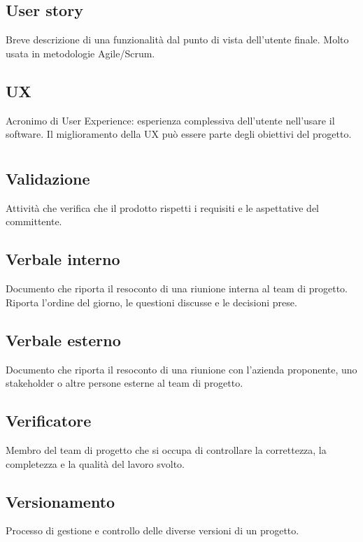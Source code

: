 \documentclass[a4paper,12pt]{article}
\begin{document}
          \subsection*{User story}
			Breve descrizione di una funzionalità dal punto di vista dell'utente finale. Molto usata in metodologie Agile/Scrum.
          \subsection*{UX}
			Acronimo di User Experience: esperienza complessiva dell'utente nell'usare il software. Il miglioramento della UX può essere parte degli obiettivi del progetto.
        
\newpage
      
        \section{}
        
          \subsection*{Validazione}
			Attività che verifica che il prodotto rispetti i requisiti e le aspettative del committente.
          \subsection*{Verbale interno}
			Documento che riporta il resoconto di una riunione interna al team di progetto. Riporta l'ordine del giorno, le questioni discusse e le decisioni prese.
          \subsection*{Verbale esterno}
			Documento che riporta il resoconto di una riunione con l'azienda proponente, uno stakeholder o altre persone esterne al team di progetto.
          \subsection*{Verificatore}
			Membro del team di progetto che si occupa di controllare la correttezza, la completezza e la qualità del lavoro svolto.
          \subsection*{Versionamento}
			Processo di gestione e controllo delle diverse versioni di un progetto.
        
\end{document}
